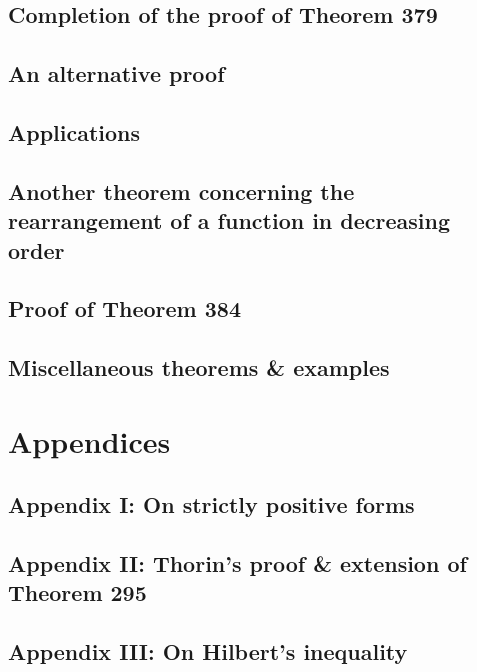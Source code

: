 \documentclass[oneside]{book}
\numberwithin{equation}{section}
\begin{document}
\subsection{Completion of the proof of Theorem 379}

\subsection{An alternative proof}

\subsection{Applications}

\subsection{Another theorem concerning the rearrangement of a function in decreasing order}

\subsection{Proof of Theorem 384}

\subsection{Miscellaneous theorems \& examples}


\section{Appendices}

\subsection{Appendix I: On strictly positive forms}

\subsection{Appendix II: Thorin's proof \& extension of Theorem 295}

\subsection{Appendix III: On Hilbert's inequality}



\printbibliography[heading=bibintoc]
	
\end{document}
